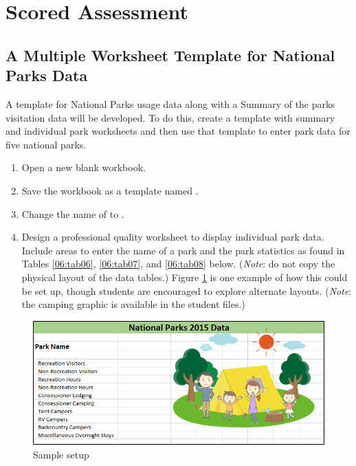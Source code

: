 \section{Scored Assessment}

\subsection{A Multiple Worksheet Template for National Parks Data}

A template for National Parks usage data along with a Summary of the parks visitation data will be developed. To do this, create a template with summary and individual park worksheets and then use that template to enter park data for five national parks.

\begin{enumerate}
	\item Open a new blank workbook.
	\item Save the workbook as a template named .
	\item Change the name of  to . 
	\item Design a professional quality worksheet to display individual park data. Include areas to enter the name of a park and the park statistics as found in Tables \ref{06:tab06}, \ref{06:tab07}, and \ref{06:tab08} below. (\textit{Note}: do not copy the physical layout of the data tables.) Figure \ref{06:fig17} is one example of how this could be set up, though students are encouraged to explore alternate layouts. (\textit{Note}: the camping graphic is available in the student files.)
\end{enumerate}

\begin{figure}[H]
	\centering
	\includegraphics[width=\maxwidth{.95\linewidth}]{gfx/ch06_fig17}
	\caption{Sample setup}
	\label{06:fig17}
\end{figure}

